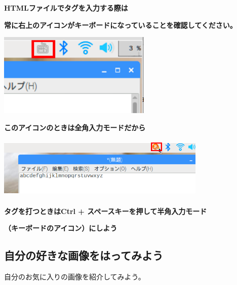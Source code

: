 \documentclass[a4paper,12pt]{jarticle}
\begin{document}
{\centering\bfseries
  HTMLファイルでタグを入力する際は
  \par}

{\centering\bfseries
  常に右上のアイコンがキーボードになっていることを確認してください。
  \par}

\centering
\includegraphics[width=7.301cm,height=3.976cm]{textbook-img159.png}





\bigskip

\bigskip

\bigskip

\bigskip


{\centering\bfseries
  このアイコンのときは全角入力モードだから
  \par}

\centering
\includegraphics[width=10.013cm,height=2.972cm]{textbook-img160.png}


\bigskip


\bigskip

{\centering\bfseries
  タグを打つときはCtrl +
  スペースキーを押して半角入力モード
  \par}

{\centering\bfseries
  （キーボードのアイコン）にしよう
  \par}

\clearpage
\flushleft
{}
\subsection{\theExercise 自分の好きな画像をはってみよう}
\addtocounter{Exercise}{-1}\label{E:embImginHTML}
自分のお気に入りの画像を紹介してみよう。
\end{document}
